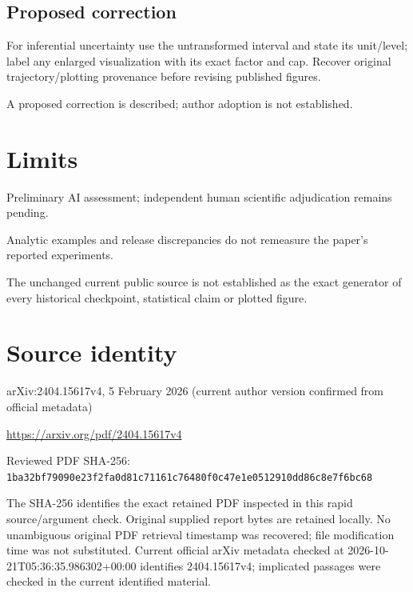 \documentclass[11pt]{article}
\begin{document}
\subsection*{Proposed correction}

For inferential uncertainty use the untransformed interval and state its unit/level; label any enlarged visualization with its exact factor and cap. Recover original trajectory/plotting provenance before revising published figures.

A proposed correction is described; author adoption is not established.

\section*{Limits}

Preliminary AI assessment; independent human scientific adjudication remains pending.\par

Analytic examples and release discrepancies do not remeasure the paper’s reported experiments.\par

The unchanged current public source is not established as the exact generator of every historical checkpoint, statistical claim or plotted figure.\par

\section*{Source identity}

arXiv:2404.15617v4, 5 February 2026 (current author version confirmed from official metadata)

\url{https://arxiv.org/pdf/2404.15617v4}

Reviewed PDF SHA-256: \nolinkurl{1ba32bf79090e23f2fa0d81c71161c76480f0c47e1e0512910dd86c8e7f6bc68}

The SHA-256 identifies the exact retained PDF inspected in this rapid source/argument check. Original supplied report bytes are retained locally. No unambiguous original PDF retrieval timestamp was recovered; file modification time was not substituted. Current official arXiv metadata checked at 2026-10-21T05:36:35.986302+00:00 identifies 2404.15617v4; implicated passages were checked in the current identified material.
\end{document}
